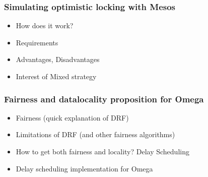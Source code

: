 \documentclass{beamer}
\begin{document}
    \begin{frame}
      \frametitle{Simulating optimistic locking with Mesos}
      \begin{itemize}
        \item How does it work?
        \item Requirements
        \item Advantages, Disadvantages
        \item Interest of Mixed strategy
      \end{itemize}
    \end{frame}

    \begin{frame}
      \frametitle{Fairness and datalocality proposition for Omega}
      \begin{itemize}
        \item Fairness (quick explanation of DRF)
        \item Limitations of DRF (and other fairness algorithms)
        \item How to get both fairness and locality? Delay Scheduling
        \item Delay scheduling implementation for Omega
      \end{itemize}
    \end{frame}
\end{document}
